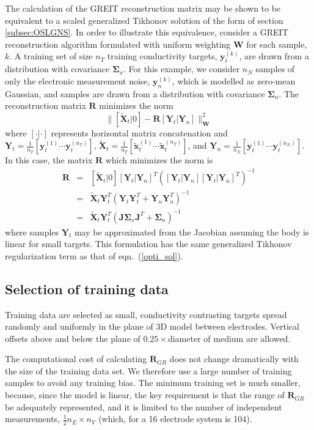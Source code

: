 \documentclass[12pt]{iopart}
\newcommand{\xT}{\mbox{$\mathbf{\tilde x}$}}
\newcommand{\XT}{\mbox{$\mathbf{\tilde X}$}}
\newcommand{\yB}{\mbox{$\mathbf{y}$}}
\newcommand{\RB}{\mbox{$\mathbf{R}$}}
\newcommand{\JB}{\mbox{$\mathbf{J}$}}
\newcommand{\WB}{\mbox{$\mathbf{W}$}}
\newcommand{\YB}{\mbox{$\mathbf{Y}$}}
\newcommand{\SG}{\mbox{${\boldsymbol \Sigma}$}}
\begin{document}
The calculation of the GREIT reconstruction matrix
may be shown to be equivalent to a scaled generalized
Tikhonov solution of the form of section \ref{subsec:OSLGNS}.
In order to illustrate this equivalence, consider
a GREIT reconstruction algorithm formulated
with uniform weighting $\WB$ for each sample, $k$. A training set
of size
$n_T$ training conductivity targets, $\yB_t^{(k)}$, are drawn from
a distribution with covariance $\SG_x$.
For this example, we consider $n_N$ samples of only the electronic
measurement noise, $\yB_n^{(k)}$, which is modelled as zero-mean
Gaussian, and samples are drawn from a distribution with 
covariance $\SG_n$. The reconstruction matrix $\RB$ minimizes
the norm
\begin{equation}
\| [ \XT_t| 0 ] - \RB [ \YB_t| \YB_n ] \|_{\WB}^2
\end{equation}
where $[\cdot|\cdot]$ represents horizontal
matrix concatenation and
$\YB_t = \frac{1}{n_T}    [ \yB_t^{(1)} \cdots \yB_t^{(n_T)} ]$,
$\XT_t = \frac{1}{n_T}    [ \xT_t^{(1)} \cdots \xT_t^{(n_T)} ]$,
and 
$\YB_n = \frac{1}{n_N} [ \yB_t^{(1)} \cdots \yB_t^{(n_N)} ]$.
In this case, the matrix $\RB$ which minimizes the norm is 
\begin{eqnarray}
\RB &=& [ \XT_t| 0 ] [\YB_t| \YB_n]^T
     \left( [\YB_t| \YB_n] [\YB_t| \YB_n]^T \right)^{-1}
\nonumber \\
    &=& \XT_t \YB_t^T \left( \YB_t \YB_t^T + \YB_n \YB_n^T \right)^{-1}
\nonumber \\
    &=& \XT_t \YB_t^T \left( \JB \SG_x \JB^T + \SG_n \right)^{-1}
\end{eqnarray}
where samples $\YB_t$ may be approximated from the Jacobian
assuming the body is linear for small targets. This formulation 
has the same generalized Tikhonov regularization 
term as that 
of eqn.\ (\ref{opti_sol}).


\subsection{Selection of training data}
\label{subsec:training_data}

Training data are selected as small, conductivity contrasting
targets spread randomly and uniformly in the plane of 3D model
between electrodes. Vertical offsets above and below the
plane of $0.25\times$diameter of medium are allowed.

The computational cost of calculating $\RB_{GR}$ does
not change dramatically with the size of the training data
set. We therefore use a large number of
training samples to avoid any training bias. The minimum training set 
is much smaller, because, since the model is
linear, the key requirement is that the range of 
$\RB_{GR}$ be adequately represented, and it is limited
to the number of independent measurements,
$\frac{1}{2} n_E \times n_V$ (which, for a 16 electrode
system is 104).
\end{document}
